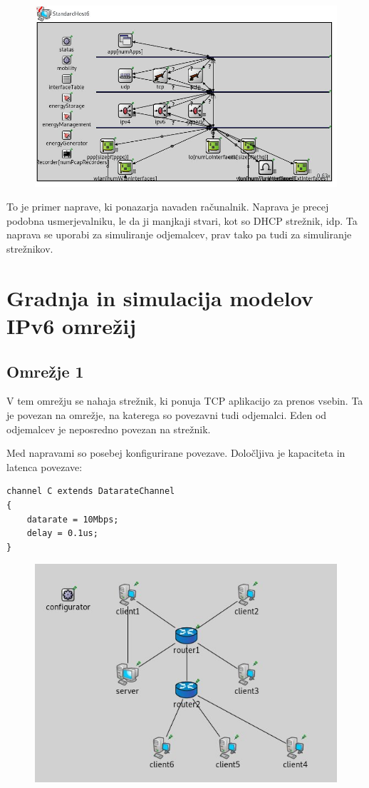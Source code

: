 \documentclass[11pt,a4paper,slovene]{myarticle}
\begin{document}
\begin{figure}[h]
  \includegraphics[width=\linewidth]{standardhost6.jpg}
\end{figure}

To je primer naprave, ki ponazarja navaden računalnik. Naprava je precej podobna usmerjevalniku, le da ji manjkaji stvari, kot so DHCP strežnik, idp.
Ta naprava se uporabi za simuliranje odjemalcev, prav tako pa tudi za simuliranje strežnikov.


\section{Gradnja in simulacija modelov IPv6 omrežij}

\subsection{Omrežje 1}
V tem omrežju se nahaja strežnik, ki ponuja TCP aplikacijo za prenos vsebin. Ta je povezan na omrežje,
na katerega so povezavni tudi odjemalci. Eden od odjemalcev je neposredno povezan na strežnik.

Med napravami so posebej konfigurirane povezave. Določljiva je kapaciteta in latenca povezave:
\begin{lstlisting}
channel C extends DatarateChannel
{
    datarate = 10Mbps;
    delay = 0.1us;
}
\end{lstlisting}


\begin{figure}[h]
  \includegraphics[width=\linewidth]{omrezje1.jpg}
\end{figure}
\end{document}
